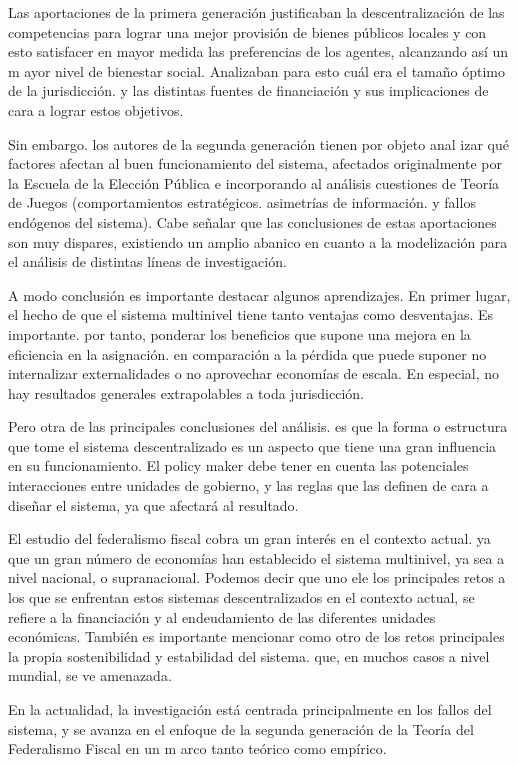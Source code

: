 \documentclass[10pt,a4paper]{article}
\begin{document}
Las aportaciones de la primera generación justificaban la descentralización de las competencias para lograr una mejor provisión de bienes públicos locales y con esto satisfacer en mayor medida las preferencias de los agentes, alcanzando así un m ayor nivel de bienestar social. Analizaban para esto cuál era el tamaño óptimo de la jurisdicción. y las distintas fuentes de financiación y sus implicaciones de cara a lograr estos objetivos. 

Sin embargo. los autores de la segunda generación tienen por objeto anal izar qué factores afectan al buen funcionamiento del sistema, afectados originalmente por la Escuela de la Elección Pública e incorporando al análisis cuestiones de Teoría de Juegos (comportamientos estratégicos. asimetrías de información. y fallos endógenos del sistema). Cabe señalar que las conclusiones de estas aportaciones son muy dispares, existiendo un amplio abanico en cuanto a la modelización para el análisis de distintas líneas de investigación.

A modo conclusión es importante destacar algunos aprendizajes. En primer lugar, el hecho de que el sistema multinivel tiene tanto ventajas como desventajas. Es importante. por tanto, ponderar los beneficios que supone una mejora en la eficiencia en la asignación. en comparación a la pérdida que puede suponer no internalizar externalidades o no aprovechar economías de escala. En especial, no hay resultados generales extrapolables a toda jurisdicción.

Pero otra de las principales conclusiones del análisis. es que la forma o estructura que tome el sistema descentralizado es un aspecto que tiene una gran influencia en su funcionamiento. El policy maker debe tener en cuenta las potenciales interacciones entre unidades de gobierno, y las reglas que las definen de cara a diseñar el sistema, ya que afectará al resultado. 

El estudio del federalismo fiscal cobra un gran interés en el contexto actual. ya que un gran número de economías han establecido el sistema multinivel, ya sea a nivel nacional, o supranacional. Podemos decir que uno ele los principales retos a los que se enfrentan estos sistemas descentralizados en el contexto actual, se refiere a la financiación y al endeudamiento de las diferentes unidades económicas. También es importante mencionar como otro de los retos principales la propia sostenibilidad y estabilidad del sistema. que, en muchos casos a nivel mundial, se ve amenazada.

En la actualidad, la investigación está centrada principalmente en los fallos del sistema, y se avanza en el enfoque de la segunda generación de la Teoría del Federalismo Fiscal en un m arco tanto teórico como empírico.
\end{document}
